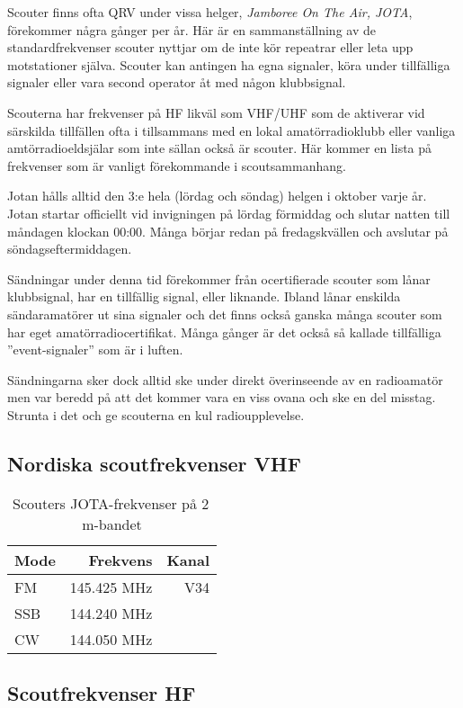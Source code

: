 {Scouter finns ofta QRV under vissa helger, \textit{Jamboree On The Air, JOTA},
förekommer några gånger per år. Här är en sammanställning av de
standardfrekvenser scouter nyttjar om de inte kör repeatrar eller leta upp
motstationer själva. Scouter kan antingen ha egna signaler, köra under
tillfälliga signaler eller vara second operator åt med någon klubbsignal.

Scouterna har frekvenser på HF likväl som VHF/UHF som de aktiverar vid
särskilda tillfällen ofta i tillsammans med en lokal amatörradioklubb eller
vanliga amtörradioeldsjälar som inte sällan också är scouter. Här kommer en
lista på frekvenser som är vanligt förekommande i scoutsammanhang.

Jotan hålls alltid den 3:e hela (lördag och söndag) helgen i oktober varje år.
Jotan startar officiellt vid invigningen på lördag förmiddag och slutar natten
till måndagen klockan 00:00. Många börjar redan på fredagskvällen och avslutar
på söndagseftermiddagen.

Sändningar under denna tid förekommer från ocertifierade scouter som lånar
klubbsignal, har en tillfällig signal, eller liknande. Ibland lånar
enskilda sändaramatörer ut sina signaler och det finns också ganska många
scouter som har eget amatörradiocertifikat. Många gånger är det också så
kallade tillfälliga ''event-signaler'' som är i luften.

Sändningarna sker dock alltid ske under direkt överinseende av en radioamatör
men var beredd på att det kommer vara en viss ovana och ske en del misstag.
Strunta i det och ge scouterna en kul radioupplevelse.

\subsection{Nordiska scoutfrekvenser VHF}

\begin{table}[h]
\centering
\begin{tabular}{lrr}
	\textbf{Mode} & \textbf{Frekvens} & \textbf{Kanal} \\ \hline
	FM            &      145.425  MHz &   V34 \\
	SSB           &      144.240  MHz &  \\
	CW            &      144.050  MHz &
\end{tabular}
\caption{Scouters JOTA-frekvenser på 2\,m-bandet}
\end{table}

\subsection{Scoutfrekvenser HF}

}
